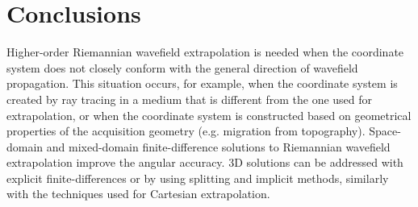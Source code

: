\section{Conclusions}
Higher-order Riemannian wavefield extrapolation is needed when the
coordinate system does not closely conform with the general direction
of wavefield propagation. This situation occurs, for example, when the
coordinate system is created by ray tracing in a medium that is
different from the one used for extrapolation, or when the coordinate
system is constructed based on geometrical properties of the
acquisition geometry (e.g. migration from topography). Space-domain
and mixed-domain finite-difference solutions to Riemannian wavefield
extrapolation improve the angular accuracy. 3D solutions can be
addressed with explicit finite-differences or by using splitting and
implicit methods, similarly with the techniques used for Cartesian
extrapolation.
